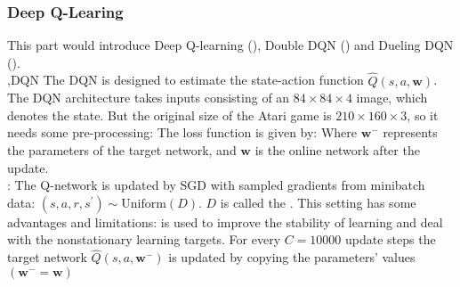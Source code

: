 \documentclass[10pt]{report}
\begin{document}
\subsubsection{Deep Q-Learing}
This part would introduce Deep Q-learning (\cite{mnih2015human}), Double DQN (\cite{van2016deep}) and Dueling DQN (\cite{wang2016dueling}).\\
\sep{DQN}
The DQN is designed to estimate the state-action function $\hat{Q}(s,a,\mathbf{w})$.
The DQN architecture takes inputs consisting of an $84\times 84\times 4$ image, which denotes the state. But the original size of the
Atari game is $210\times160\times3$, so it needs some pre-processing:
The loss function is given by:
Where $\mathbf{w}^-$ represents the parameters of the target network, and $\mathbf{w}$ is the online network after the update.\\
: The Q-network is updated by SGD with sampled gradients from minibatch data: $(s,a,r,s^{\prime})\sim\mathrm{Uniform}(D).$
$D$ is called the . This setting has some advantages and limitations:
 is used to improve the stability of learning and deal with the nonstationary learning targets.
For every $C=10000$ update steps the target network $\hat{Q}(s,a,\mathbf{w}^{-})$ is updated by copying the parameters' values $(\mathbf{w}^{-}=\mathbf{w})$
\end{document}
